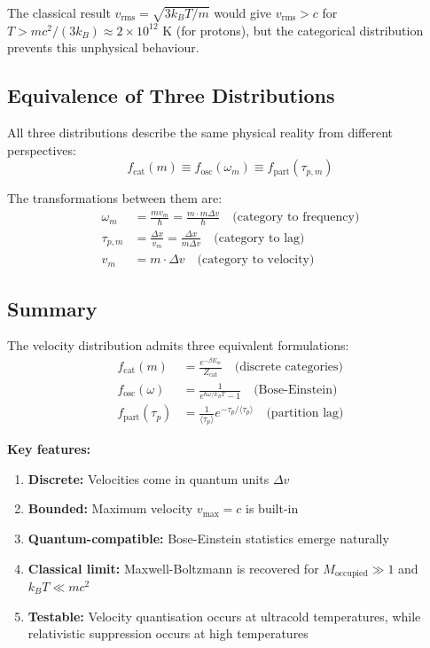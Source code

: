 The classical result $v_{\text{rms}} = \sqrt{3k_B T/m}$ would give $v_{\text{rms}} > c$ for $T > mc^2/(3k_B) \approx 2 \times 10^{12}$ K (for protons), but the categorical distribution prevents this unphysical behaviour.

\subsection{Equivalence of Three Distributions}

All three distributions describe the same physical reality from different perspectives:
\begin{equation}
f_{\text{cat}}(m) \equiv f_{\text{osc}}(\omega_m) \equiv f_{\text{part}}(\tau_{p,m})
\end{equation}

The transformations between them are:
\begin{align}
\omega_m &= \frac{mv_m}{\hbar} = \frac{m \cdot m\Delta v}{\hbar} \quad \text{(category to frequency)} \\
\tau_{p,m} &= \frac{\Delta x}{v_m} = \frac{\Delta x}{m\Delta v} \quad \text{(category to lag)} \\
v_m &= m \cdot \Delta v \quad \text{(category to velocity)}
\end{align}

\subsection{Summary}

The velocity distribution admits three equivalent formulations:
\begin{align}
f_{\text{cat}}(m) &= \frac{e^{-\beta E_m}}{Z_{\text{cat}}} \quad \text{(discrete categories)} \\
f_{\text{osc}}(\omega) &= \frac{1}{e^{\hbar\omega/k_B T} - 1} \quad \text{(Bose-Einstein)} \\
f_{\text{part}}(\tau_p) &= \frac{1}{\langle\tau_p\rangle} e^{-\tau_p/\langle\tau_p\rangle} \quad \text{(partition lag)}
\end{align}

\textbf{Key features:}
\begin{enumerate}
\item \textbf{Discrete:} Velocities come in quantum units $\Delta v$
\item \textbf{Bounded:} Maximum velocity $v_{\max} = c$ is built-in
\item \textbf{Quantum-compatible:} Bose-Einstein statistics emerge naturally
\item \textbf{Classical limit:} Maxwell-Boltzmann is recovered for $M_{\text{occupied}} \gg 1$ and $k_B T \ll mc^2$
\item \textbf{Testable:} Velocity quantisation occurs at ultracold temperatures, while relativistic suppression occurs at high temperatures
\end{enumerate}

